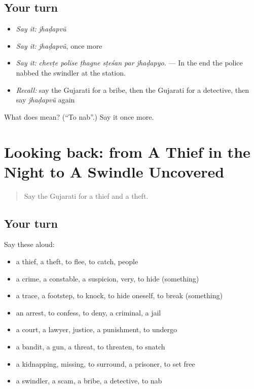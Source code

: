 \subsection*{Your turn}
\begin{itemize}
\raggedright
  \item \emph{Say it:} \emph{jhaḍapvũ}
  \item \emph{Say it:} \emph{jhaḍapvũ}, once more
  \item \emph{Say it:} \emph{chevṭe polīse ṭhagne sṭeśan par jhaḍapyo.} — In the end the police nabbed the swindler at the station.
  \item \emph{Recall:} say the Gujarati for a bribe, then the Gujarati for a detective, then say \emph{jhaḍapvũ} again
\end{itemize}

\begin{tcolorbox}[breakable,colback=teal!4,colframe=teal!35!black,title={Before you move on}]
What does  mean? (\textquotedblleft{}To nab\textquotedblright{}.) Say it once more.
\end{tcolorbox}
\section[(dialogue)]{Looking back: from A Thief in the Night to A Swindle Uncovered}

\label{lesson:GU-R292-review-285-292}



\begin{quote}
Say the Gujarati for a thief and a theft.
\end{quote}

\subsection*{Your turn}
Say these aloud:

\begin{itemize}
\raggedright
  \item a thief, a theft, to flee, to catch, people
  \item a crime, a constable, a suspicion, very, to hide (something)
  \item a trace, a footstep, to knock, to hide oneself, to break (something)
  \item an arrest, to confess, to deny, a criminal, a jail
  \item a court, a lawyer, justice, a punishment, to undergo
  \item a bandit, a gun, a threat, to threaten, to snatch
  \item a kidnapping, missing, to surround, a prisoner, to set free
  \item a swindler, a scam, a bribe, a detective, to nab
\end{itemize}

